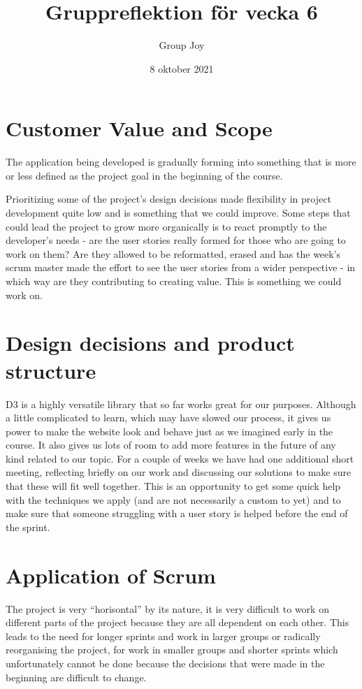\documentclass{scrartcl}
\begin{document}
\title{Gruppreflektion för vecka 6}
\author{Group Joy}
\date{8 oktober 2021}
\maketitle

\section{Customer Value and Scope}
The application being developed is gradually forming into something that is more or less defined as the project goal in the beginning of the course.

Prioritizing some of the project's design decisions made flexibility in project development quite low and is something that we could improve. Some steps that could lead the project to grow more organically is to react promptly to the developer’s needs - are the user stories really formed for those who are going to work on them? Are they allowed to be reformatted, erased and has the week’s scrum master made the effort to see the user stories from a wider perspective - in which way are they contributing to creating value. This is something we could work on.

\section{Design decisions and product structure}
D3 is a highly versatile library that so far works great for our purposes. Although a little complicated to learn, which may have slowed our process, it gives us power to make the website look and behave just as we imagined early in the course. It also gives us lots of room to add more features in the future of any kind related to our topic. 
For a couple of weeks we have had one additional short meeting, reflecting briefly on our work and discussing our solutions to make sure that these will fit well together. This is an opportunity to get some quick help with the techniques we apply (and are not necessarily a custom to yet) and to make sure that someone struggling with a user story is helped before the end of the sprint.

\section{Application of Scrum}
The project is very “horisontal” by its nature, it is very difficult to work on different parts of the project because they are all dependent on each other. This leads to the need for longer sprints and work in larger groups or radically reorganising the project, for work in smaller groups and shorter sprints which unfortunately cannot be done because the decisions that were made in the beginning are difficult to change.
\end{document}
